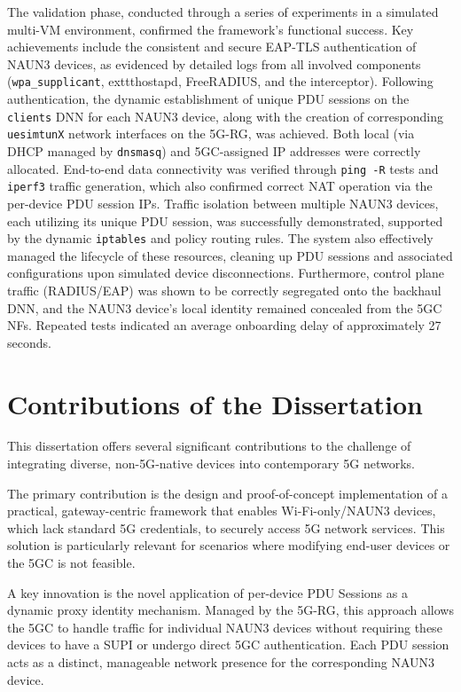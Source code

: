 The validation phase, conducted through a series of experiments in a simulated multi-\ac{VM} environment, confirmed the framework's functional success. Key achievements include the consistent and secure \ac{EAP-TLS} authentication of \ac{NAUN3} devices, as evidenced by detailed logs from all involved components (\texttt{wpa\_supplicant}, 	exttt{hostapd}, FreeRADIUS, and the interceptor). Following authentication, the dynamic establishment of unique \ac{PDU} sessions on the \texttt{clients} \ac{DNN} for each \ac{NAUN3} device, along with the creation of corresponding \texttt{uesimtunX} network interfaces on the \ac{5G-RG}, was achieved. Both local (via \ac{DHCP} managed by \texttt{dnsmasq}) and \ac{5GC}-assigned \ac{IP} addresses were correctly allocated. End-to-end data connectivity was verified through \texttt{ping -R} tests and \texttt{iperf3} traffic generation, which also confirmed correct \ac{NAT} operation via the per-device \ac{PDU} session \acp{IP}. Traffic isolation between multiple \ac{NAUN3} devices, each utilizing its unique \ac{PDU} session, was successfully demonstrated, supported by the dynamic \texttt{iptables} and policy routing rules. The system also effectively managed the lifecycle of these resources, cleaning up \ac{PDU} sessions and associated configurations upon simulated device disconnections. Furthermore, control plane traffic (\ac{RADIUS}/\ac{EAP}) was shown to be correctly segregated onto the backhaul \ac{DNN}, and the \ac{NAUN3} device's local identity remained concealed from the \ac{5GC} \acp{NF}. Repeated tests indicated an average onboarding delay of approximately 27 seconds.

\section{Contributions of the Dissertation}

This dissertation offers several significant contributions to the challenge of integrating diverse, non-\ac{5G}-native devices into contemporary \ac{5G} networks.

The primary contribution is the design and proof-of-concept implementation of a practical, gateway-centric framework that enables Wi-Fi-only/\ac{NAUN3} devices, which lack standard \ac{5G} credentials, to securely access \ac{5G} network services. This solution is particularly relevant for scenarios where modifying end-user devices or the \ac{5GC} is not feasible.

A key innovation is the novel application of per-device \ac{PDU} Sessions as a dynamic proxy identity mechanism. Managed by the \ac{5G-RG}, this approach allows the \ac{5GC} to handle traffic for individual \ac{NAUN3} devices without requiring these devices to have a \ac{SUPI} or undergo direct \ac{5GC} authentication. Each \ac{PDU} session acts as a distinct, manageable network presence for the corresponding \ac{NAUN3} device.


